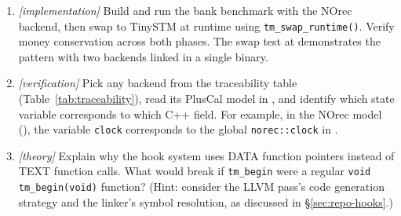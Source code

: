 \begin{enumerate}
    \item \emph{[implementation]} Build and run the bank benchmark with
          the NOrec backend, then swap to TinySTM at runtime using
          \texttt{tm\_swap\_runtime()}.  Verify money conservation across
          both phases.  The swap test at
           demonstrates the
          pattern with two backends linked in a single binary.

    \item \emph{[verification]} Pick any backend from the traceability
          table (Table~\ref{tab:traceability}), read its PlusCal model in
          , and identify which state variable corresponds
          to which C++ field.  For example, in the NOrec model
          (), the variable \texttt{clock} corresponds to
          the global \texttt{norec::clock} in
          .

    \item \emph{[theory]} Explain why the hook system uses DATA function
          pointers instead of TEXT function calls.  What would break if
          \texttt{tm\_begin} were a regular \texttt{void tm\_begin(void)}
          function?  (Hint: consider the LLVM pass's code generation
          strategy and the linker's symbol resolution, as discussed in
          \S\ref{sec:repo-hooks}.)
\end{enumerate}

